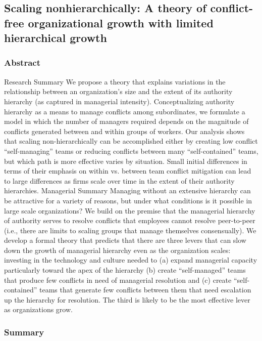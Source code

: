 \documentclass[12pt]{article}
\begin{document}
\subsection*{Scaling nonhierarchically: A theory of conflict-free organizational growth with limited hierarchical growth\cite{nonhierarchically}}

\subsubsection*{Abstract}
Research Summary We propose a theory that explains variations in the relationship between an organization's size and the extent of its authority hierarchy (as captured in managerial intensity). Conceptualizing authority hierarchy as a means to manage conflicts among subordinates, we formulate a model in which the number of managers required depends on the magnitude of conflicts generated between and within groups of workers. Our analysis shows that scaling non-hierarchically can be accomplished either by creating low conflict ``self-managing'' teams or reducing conflicts between many ``self-contained'' teams, but which path is more effective varies by situation. Small initial differences in terms of their emphasis on within vs. between team conflict mitigation can lead to large differences as firms scale over time in the extent of their authority hierarchies. Managerial Summary Managing without an extensive hierarchy can be attractive for a variety of reasons, but under what conditions is it possible in large scale organizations? We build on the premise that the managerial hierarchy of authority serves to resolve conflicts that employees cannot resolve peer-to-peer (i.e., there are limits to scaling groups that manage themselves consensually). We develop a formal theory that predicts that there are three levers that can slow down the growth of managerial hierarchy even as the organization scales: investing in the technology and culture needed to (a) expand managerial capacity particularly toward the apex of the hierarchy (b) create ``self-managed'' teams that produce few conflicts in need of managerial resolution and (c) create ``self-contained'' teams that generate few conflicts between them that need escalation up the hierarchy for resolution. The third is likely to be the most effective lever as organizations grow.

\subsubsection*{Summary}
\end{document}

